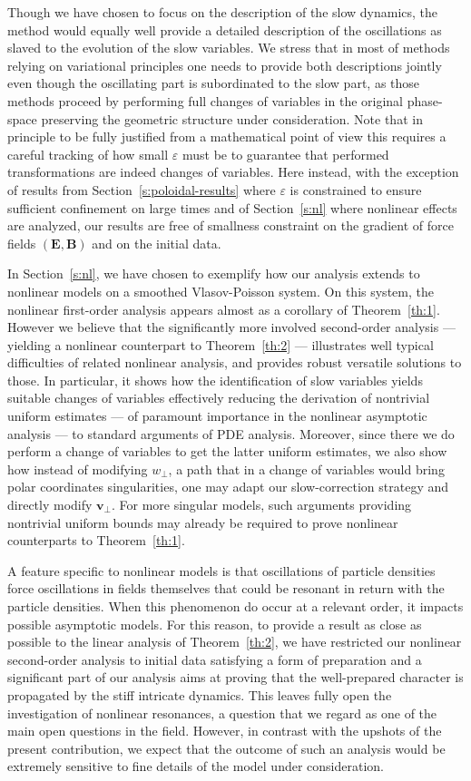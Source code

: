 \documentclass[10pt]{amsart}
\newcommand{\sperp}{{\scriptscriptstyle\perp}}
\let\eps\varepsilon
\theoremstyle{plain}
\theoremstyle{definition}
\newcommand\bB{{\boldsymbol B}}
\newcommand\bE{{\boldsymbol E}}
\newcommand\bfv{{\boldsymbol v}}
\newcommand\bvperp{\bfv_{\!\sperp}}
\newcommand\eperp{w_{\!\sperp}}
\begin{document}
Though we have chosen to focus on the description of the slow
dynamics, the method would equally well provide a detailed description
of the oscillations as slaved to the evolution of the slow
variables. We stress that in most of methods relying on variational
principles one needs to provide both descriptions jointly even though
the oscillating part is subordinated to the slow part, as those
methods proceed by performing full changes of variables in the
original phase-space preserving the geometric structure under
consideration. Note that in principle to be fully justified from a
mathematical point of view this requires a careful tracking of how
small $\eps$ must be to guarantee that performed transformations are
indeed changes of variables. Here instead, with the exception of
results from Section~\ref{s:poloidal-results} where $\eps$ is
constrained to ensure sufficient confinement on large times and of Section~\ref{s:nl} where nonlinear effects are analyzed, our
results are free of smallness constraint on the gradient of force
fields $(\bE,\bB)$ and on the initial data.

In Section~\ref{s:nl}, we have chosen to exemplify how our analysis extends to nonlinear models on a smoothed Vlasov-Poisson system. On this system, the nonlinear first-order analysis appears almost as a corollary of Theorem~\ref{th:1}. However we believe that the significantly more involved second-order analysis --- yielding a nonlinear counterpart to Theorem~\ref{th:2} --- illustrates well typical difficulties of related nonlinear analysis, and provides robust versatile solutions to those. In particular, it shows how the identification of slow variables yields suitable changes of variables effectively reducing the derivation of nontrivial uniform estimates --- of paramount importance in the nonlinear asymptotic analysis --- to standard arguments of PDE analysis. Moreover, since there we do perform a change of variables to get the latter uniform estimates, we also show how instead of modifying $\eperp$, a path that in a change of variables would bring \hbox{polar} coordinates singularities, one may adapt our slow-correction strategy and directly modify $\bvperp$. For more singular models, such arguments providing nontrivial uniform bounds may already be required to prove nonlinear counterparts to Theorem~\ref{th:1}.

A feature specific to nonlinear models is that oscillations of particle densities force oscillations in fields themselves that could be resonant in return with the particle densities. When this phenomenon do occur at a relevant order, it impacts possible asymptotic models. For this reason, to provide a result as close as possible to the linear analysis of Theorem~\ref{th:2}, we have restricted our nonlinear second-order analysis to initial data satisfying a form of preparation and a significant part of our analysis aims at proving that the well-prepared character is propagated by the stiff intricate dynamics. This leaves fully open the investigation of nonlinear resonances, a question that we regard as one of the main open questions in the field. However, in contrast with the upshots of the present contribution, we expect that the outcome of such an analysis would be extremely sensitive to fine details of the model under consideration.
\end{document}
